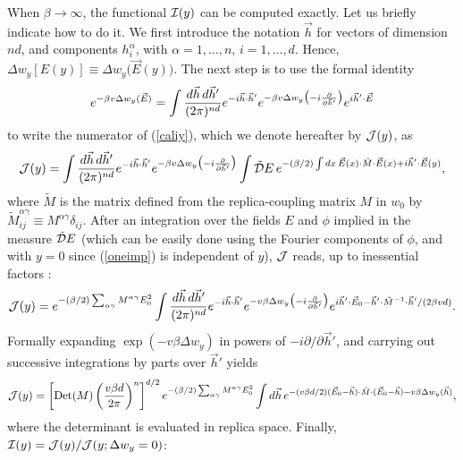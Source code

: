 When $\beta\to\infty$, the functional ${\cal{I}}(y)$ can be computed
exactly. Let us briefly indicate how to do it. We first introduce the
notation $\vec{h}$ for vectors of dimension $nd$, and components
$h^\alpha_i$, with $\alpha=1,\ldots,n$, $i=1,\ldots,d$. Hence,
$\Delta w_y[E(y)]\equiv \Delta w_y\bigl(\vec{E}(y)\bigr)$. The next
step is to use the formal identity
\begin{equation}
e^{-\beta v\Delta w_y(\vec{E})}=\int{d\vec{h}\,d\vec{h}'\over (2\pi)^{nd}}e^{-i\vec{h}\cdot \vec{h}'} e^{-\beta v\Delta w_y\bigl(-i\frac{\partial}{\partial \vec{h}'}\bigr)} e^{i \vec{h}'\cdot \vec{E}}
\end{equation}
to write the numerator of (\ref{caliy}), which we denote hereafter by
${\cal{J}}(y)$, as
\begin{equation}
{\cal{J}}(y)=\int{d\vec{h}\, d\vec{h}'\over (2\pi)^{nd}}e^{-i\vec{h}\cdot \vec{h}'} e^{-\beta v \Delta w_y\bigl(-i\frac{\partial}{\partial\vec{h}'}\bigr)}\int\tilde{\cal{D}}E\,e^{-(\beta/2)\int dx\, \vec{E}(x)\cdot \tilde{M} \cdot \vec{E}(x)+i\vec{h}'\cdot \vec{E}(y)},
\end{equation}
where $\tilde{M}$ is the matrix defined from the replica-coupling
matrix $M$ in $w_0$ by $\tilde{M}^{\alpha\gamma}_{ij}\equiv
M^{\alpha\gamma}\delta_{ij}$. After an integration over the fields $E$
and $\phi$ implied in the measure $\tilde{\cal{D}}E$ (which can be
easily done using the Fourier components of $\phi$, and with $y=0$
since (\ref{oneimp}) is independent of $y$), $\cal{J}$ reads, up to
inessential factors \cite{NOTE2}:
\begin{equation}
{\cal{J}}(y)=e^{-(\beta/2)\sum_{\alpha\gamma}M^{\alpha\gamma}E_0^2}
\int{d\vec{h}\, d\vec{h}'\over (2\pi)^{nd}}e^{-i\vec{h}\cdot \vec{h}'}
e^{-v\beta\Delta w_y\bigl(-i\frac{\partial}{\partial \vec{h}'}\bigr)}
e^{i \vec{h}'\cdot \vec{E}_0-\vec{h}'\cdot \tilde{M}^{-1} \cdot \vec{h}'/(2\beta v d)}.
\end{equation}
Formally expanding $\exp(-v\beta\Delta w_y)$ in powers of
$-i\partial/\partial \vec{h}'$, and carrying out successive
integrations by parts over $\vec{h}'$ yields
\begin{equation}
{\cal{J}}(y)=\left[\mathop{\text{Det}}(M)\left(\frac{v\beta d}{2\pi}\right)^n\right]^{d/2}
e^{-(\beta/2)\sum_{\alpha\gamma}M^{\alpha\gamma}E_0^2}\int d\vec{h}\,
e^{-(v \beta d/2)(\vec{E}_0-\vec{h})\cdot \tilde{M}\cdot(\vec{E}_0-\vec{h})-v\beta\Delta w_y(\vec{h})},
\end{equation}
where the determinant is evaluated in replica space. Finally,
${\cal{I}}(y)={\cal{J}}(y)/{\cal{J}}(y;\Delta w_y=0)$:
